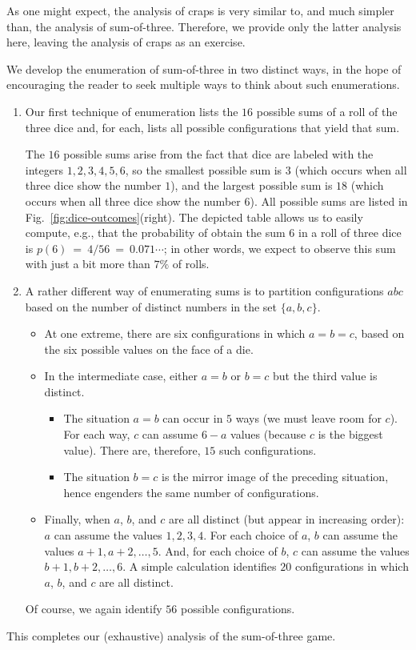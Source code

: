 \medskip

As one might expect, the analysis of craps is very similar to, and much simpler than, the analysis of sum-of-three.  Therefore, we provide only the latter analysis here, leaving the analysis of craps as an exercise.

\medskip

We develop the enumeration of sum-of-three in two distinct ways, in the hope of encouraging the reader to seek multiple ways to think about such enumerations.
\begin{enumerate}
\item 
Our first technique of enumeration lists the $16$ possible sums of a roll of the three  dice and, for each, lists all possible configurations that yield that sum.

\smallskip

The $16$ possible sums arise from the fact that dice are labeled with the integers $1, 2, 3, 4, 5, 6$, so the smallest possible sum is $3$ (which occurs when all three dice show the number $1$), and the largest possible sum is $18$ (which occurs when all three dice show the number $6$).  All possible sums are listed in Fig.~\ref{fig:dice-outcomes}(right).  The depicted table allows us to easily compute, e.g., that the probability of obtain the sum $6$ in a roll of three dice is $p(6) \ = \ 4/56 \ = \ 0.071\cdots$; in other words, we expect to observe this sum with just a bit more than $7\%$ of rolls.

\item 
A rather different way of enumerating sums is to partition configurations $abc$ based on the number of distinct numbers in the set $\{ a, b, c\}$.
\begin{itemize}
\item
At one extreme, there are six configurations in which $a = b = c$, based on the six possible values on the face of a die.
\item
In the intermediate case, either $a=b$ or $b=c$ but the third value is distinct.
  \begin{itemize}
  \item
The situation $a=b$ can occur in $5$ ways (we must leave room for $c$).  For each way, $c$ can assume $6-a$ values (because $c$ is the biggest value).  There are, therefore, $15$ such configurations.
  \item
The situation $b=c$ is the mirror image of the preceding situation, hence engenders the same number of configurations.
  \end{itemize}

\item
Finally, when $a$, $b$, and $c$ are all distinct (but appear in increasing order): $a$ can assume the values $1, 2, 3, 4$.  For each choice of $a$, $b$ can assume the values $a+1, a+2, \ldots, 5$.  And, for each choice of $b$, $c$ can assume the values $b+1, b+2, \ldots, 6$.  A simple calculation identifies $20$ configurations in which $a$, $b$, and $c$ are all distinct.
\end{itemize}
Of course, we again identify $56$ possible configurations.
\end{enumerate}
This completes our (exhaustive) analysis of the sum-of-three game.

